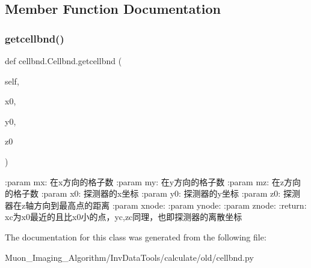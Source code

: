 \subsection{Member Function Documentation}
\mbox{\label{classcellbnd_1_1Cellbnd_ab3da9265f3521355694ad6a1bf33e3f5}} 
\subsubsection{\texorpdfstring{getcellbnd()}{getcellbnd()}}
{\footnotesize\ttfamily def cellbnd.\+Cellbnd.\+getcellbnd (\begin{DoxyParamCaption}\item[{}]{self,  }\item[{}]{x0,  }\item[{}]{y0,  }\item[{}]{z0 }\end{DoxyParamCaption})}

\begin{DoxyVerb}:param mx: 在x方向的格子数
:param my: 在y方向的格子数
:param mz: 在z方向的格子数
:param x0: 探测器的x坐标
:param y0: 探测器的y坐标
:param z0: 探测器在z轴方向到最高点的距离
:param xnode:
:param ynode:
:param znode:
:return: xc为x0最近的且比x0小的点，yc,zc同理，也即探测器的离散坐标
\end{DoxyVerb}
 

The documentation for this class was generated from the following file\+:\begin{DoxyCompactItemize}
\item 
Muon\+\_\+\+Imaging\+\_\+\+Algorithm/\+Inv\+Data\+Tools/calculate/old/cellbnd.\+py\end{DoxyCompactItemize}
